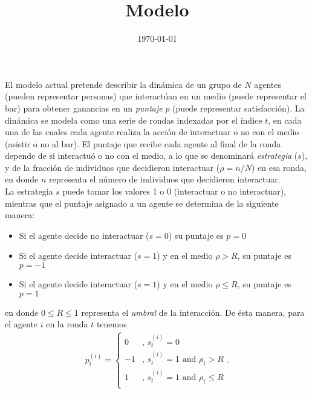 \documentclass[amsmath,amssymb]{article}
\begin{document}
                                                                
\title{Modelo}
\author{}                                      
\date{\today}
\maketitle

El modelo actual pretende describir la dinámica de un grupo de $N$ agentes (pueden representar personas) que interactúan en un medio (puede representar el bar) para obtener ganancias en un {\it puntaje} $p$ (puede representar satisfacción). La dinámica se modela como una serie de rondas indexadas por el índice $t$, en cada una de las cuales cada agente realiza la acción de interactuar o no con el medio (asistir o no al bar). El puntaje que recibe cada agente al final de la ronda depende de si interactuó o no con el medio, a lo que se denominará {\it estrategia} ($s$), y de la fracción de individuos que decidieron interactuar ($\rho=n/N$) en esa ronda, en donde $n$ representa el número de individuos que decidieron interactuar.\\

La estrategia $s$ puede tomar los valores 1 o 0 (interactuar o no interactuar), mientras que el puntaje asignado a un agente se determina de la siguiente manera:
\begin{itemize}
\item Si el agente decide no interactuar ($s=0$) su puntaje es $p=0$
\item Si el agente decide interactuar ($s=1$) y en el medio $\rho>R$, su puntaje es $p=-1$
\item Si el agente decide interactuar ($s=1$) y en el medio $\rho\leq R$, su puntaje es $p=1$
\end{itemize}
en donde $0\leq R\leq 1$ representa el {\it umbral} de la interacción. De ésta manera, para el agente $i$ en la ronda $t$ tenemos
\begin{align}
  p_t^{(i)}=\left\{
  \begin{array}{cl}
    0 & \mbox{, }s_{t}^{(i)}=0\\
    -1 & \mbox{, }s_{t}^{(i)}=1 \mbox{ and }\rho_t>R\\
    1 & \mbox{, }s_{t}^{(i)}=1 \mbox{ and }\rho_t\leq R\\
  \end{array}
  \right. .
\end{align}
\end{document}
